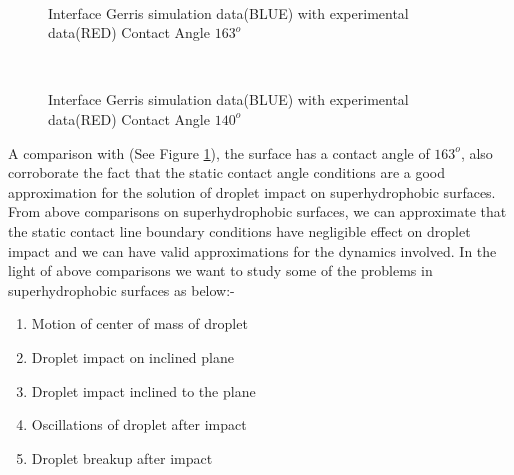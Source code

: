 \begin{figure}[H]
 \centering
       \\
    \caption{Interface Gerris simulation data(BLUE) with \cite{Wang2007} experimental data(RED) Contact Angle $163^o$ }
 \label{Fig:gs7}
 \end{figure}   
  \begin{figure}[H]
 \centering
       \\
    \caption{Interface Gerris simulation data(BLUE) with \cite{Wang2007} experimental data(RED) Contact Angle $140^o$}
 \label{Fig:gs8}
 \end{figure}   
A comparison with \cite{Wang2007} (See Figure \ref{Fig:gs7}), the surface has a contact angle of $163^o$, also corroborate the fact that the static contact angle conditions
are a good approximation for the solution of droplet impact on superhydrophobic surfaces.\\
 From above comparisons on superhydrophobic surfaces, we can approximate that the static contact line boundary conditions have negligible effect on droplet impact and we can have
 valid approximations for the dynamics involved.  In the light of above comparisons we want to study some of the problems in superhydrophobic surfaces 
 as below:-  
\begin{enumerate}
\item Motion of center of mass of droplet 
 \item Droplet impact on inclined plane
 \item Droplet impact inclined to the plane
 \item Oscillations of droplet after impact
 \item Droplet breakup after impact
\end{enumerate}

